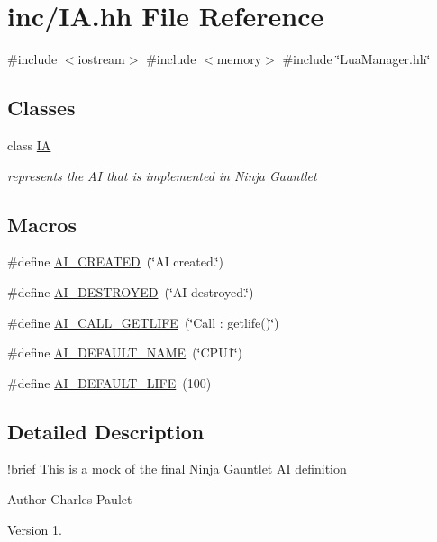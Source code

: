 \hypertarget{_i_a_8hh}{}\section{inc/\+IA.hh File Reference}
\label{_i_a_8hh}
{\ttfamily \#include $<$iostream$>$}\newline
{\ttfamily \#include $<$memory$>$}\newline
{\ttfamily \#include \char`\"{}Lua\+Manager.\+hh\char`\"{}}\newline
\subsection*{Classes}
\begin{DoxyCompactItemize}
\item 
class \hyperlink{class_i_a}{IA}
\begin{DoxyCompactList}\small\item\em represents the AI that is implemented in Ninja Gauntlet \end{DoxyCompactList}\end{DoxyCompactItemize}
\subsection*{Macros}
\begin{DoxyCompactItemize}
\item 
\#define \hyperlink{_i_a_8hh_abdf6e72c2b9c22e380246ff54f98c20b}{A\+I\+\_\+\+C\+R\+E\+A\+T\+ED}~(\char`\"{}AI created.\char`\"{})
\item 
\#define \hyperlink{_i_a_8hh_a7582ad43aa5cfa7ac763c4fcc5278f57}{A\+I\+\_\+\+D\+E\+S\+T\+R\+O\+Y\+ED}~(\char`\"{}AI destroyed.\char`\"{})
\item 
\#define \hyperlink{_i_a_8hh_af7188da064556db487cb62f9c656ec52}{A\+I\+\_\+\+C\+A\+L\+L\+\_\+\+G\+E\+T\+L\+I\+FE}~(\char`\"{}Call \+: getlife()\char`\"{})
\item 
\#define \hyperlink{_i_a_8hh_aa18cc8aca1abfc0505e365219b27acdd}{A\+I\+\_\+\+D\+E\+F\+A\+U\+L\+T\+\_\+\+N\+A\+ME}~(\char`\"{}C\+P\+U1\char`\"{})
\item 
\#define \hyperlink{_i_a_8hh_a9b7d7f935f09570d40961cbfaf619bb0}{A\+I\+\_\+\+D\+E\+F\+A\+U\+L\+T\+\_\+\+L\+I\+FE}~(100)
\end{DoxyCompactItemize}


\subsection{Detailed Description}
!brief This is a mock of the final Ninja Gauntlet AI definition \begin{DoxyAuthor}{Author}
Charles Paulet 
\end{DoxyAuthor}
\begin{DoxyVersion}{Version}
1. 
\end{DoxyVersion}



